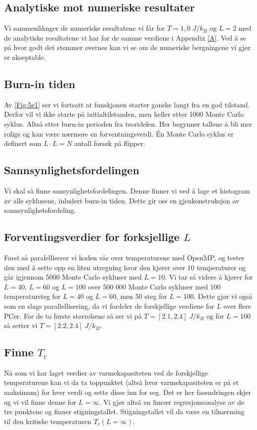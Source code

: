 \documentclass[reprint,english,notitlepage]{revtex4-2}  %
\begin{document}
\subsection{Analytiske mot numeriske resultater}

Vi sammenliknger de numeriske resultatene vi får for $T = 1,0 \; J/k_B$ og $L =2$ med de analytiske resultatene vi har for de samme verdiene i Appendix \ref{A}. Ved å se på hvor godt det stemmer overnes kan vi se om de numeriske bergningene vi gjør er akseptable.
\subsection{Burn-in tiden}
Av \autoref{Fig:5e1} ser vi fortsatt at funskjonen starter ganske langt fra en god tilstand. Derfor vil vi ikke starte på initialtilstanden, men heller etter 1000 Monte Carlo syklus. Altså etter burn-in perioden fra teoridelen. Her begynner tallene å bli mer rolige og kan være nærmere en forventningsverdi. Én Monte Carlo syklus er definert som $L\cdot L=N$ antall forsøk på flipper.
\subsection{Sannsynlighetsfordelingen}
Vi skal så finne sansynlighetsfordelingen. Denne finner vi ved å lage et histogram av alle syklusene, inludert burn-in tiden. Dette gir oss en gjenkonstruksjon av sannsynlighetsfordeling.

\subsection{Forventingsverdier for forksjellige $L$}

Først så paralelliserer vi koden vår over temperaturene med OpenMP, og tester den med å sette opp en liten utregning hvor den kjører over 10 temperaturer og går igjennom 5000 Monte Carlo sykluser med $L = 10$. Vi tar så videre å kjører for $L = 40$, $L = 60$ og $L = 100$ over 500 000 Monte Carlo sykluser med 100 temperatursteg for $L = 40$ og $L = 60$, men 50 steg for $L = 100$. Dette gjør vi også som en slags parallellisering, da vi fordeler de forskjellige verdiene for $L$ over flere PCer. For de to første størrelsene så ser vi på $T = [2.1, 2.4] \; J/k_B$ og for $L = 100$ så setter vi $T = [2.2, 2.4] \; J/k_B$.
\subsection{Finne $T_c$}
Nå som vi har laget verdier av varmekapasiteten ved de forskjellige temperaturene kan vi da ta toppunktet (altså hvor varmekapasiteten er på et maksimum) for hver verdi og sette disse inn for seg. Det er her fasendringen skjer og vi vil finne denne for $L=\infty$. Vi gjør altså en lineær regresjonsanalyse av de tre punktene og finner stigningstallet. Stigningstallet vil da være en tilnærming til den kritiske temperaturen $T_c(L=\infty)$.
\end{document}
